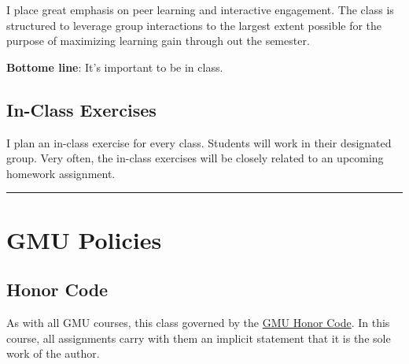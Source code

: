 \documentclass[11pt]{article}
\begin{document}
I place great emphasis on peer learning and interactive engagement. The
class is structured to leverage group interactions to the largest extent
possible for the purpose of maximizing learning gain through out the
semester.

\textbf{Bottome line}: It's important to be in class.

\subsection{In-Class Exercises}\label{in-class-exercises}

I plan an in-class exercise for every class. Students will work in their
designated group. Very often, the in-class exercises will be closely
related to an upcoming homework assignment.



\begin{center}\rule{0.5\linewidth}{0.5pt}\end{center}




\section{GMU Policies}
\subsection{Honor Code}\label{sec:honor-code}

As with all GMU courses, this class governed by the \href{https://academicstandards.gmu.edu}{GMU Honor Code}. In this course, all assignments carry with them an implicit statement that it is the sole work of the author.
\end{document}
